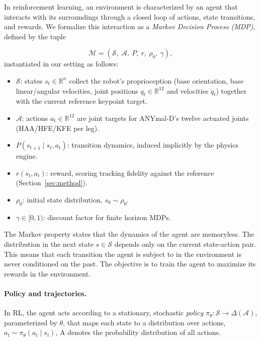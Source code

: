 \documentclass{article}
\theoremstyle{plain}
\theoremstyle{definition}
\theoremstyle{remark}
\begin{document}
In reinforcement learning, an environment is characterized by an agent that interacts with its surroundings through a closed loop of actions, state transitions, and rewards. We formalize this interaction as a \textit{Markov Decision Process (MDP)}, defined by the tuple

\begin{equation}
    \mathcal{M} = \left( \mathcal{S},\ \mathcal{A},\ P,\ r,\ \rho_0,\ \gamma \right),
\end{equation}
instantiated in our setting as follows:
\begin{itemize}
    \item $\mathcal{S}$: states $s_t \in \mathbb{R}^{n}$ collect the robot's
          proprioception (base orientation, base linear/angular velocities, joint
          positions $q_t \in \mathbb{R}^{12}$ and velocities $\dot{q}_t$) together
          with the current reference keypoint target.
    \item $\mathcal{A}$: actions $a_t \in \mathbb{R}^{12}$ are joint targets for
          ANYmal-D's twelve actuated joints (HAA/HFE/KFE per leg).
    \item $P(s_{t+1} \mid s_t, a_t)$: transition dynamics, induced implicitly by
          the physics engine.
    \item $r(s_t, a_t)$: reward, scoring tracking fidelity against the reference
          (Section~\ref{sec:method}).
    \item $\rho_0$: initial state distribution, $s_0 \sim \rho_0$.
    \item $\gamma \in [0,1)$: discount factor for finite horizon MDPs.
\end{itemize}

The Markov property states that the dynamics of the agent are memoryless. The distribution in the next state $s \in \mathcal{S}$ depends only on the current state-action pair. This means that each transition the agent is subject to in the environment is never conditioned on the past. The objective is to train the agent to maximize its rewards in the environment.

\paragraph{Policy and trajectories.}
In RL, the agent acts according to a stationary, stochastic \emph{policy}
$\pi_\theta : \mathcal{S} \to \Delta(\mathcal{A})$, parameterized by $\theta$,
that maps each state to a distribution over actions,
$a_t \sim \pi_\theta(a_t \mid s_t)$, A denotes the
probability distribution of all actions. 
\end{document}
